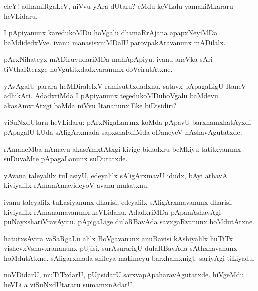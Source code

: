 \documentclass{article}
\begin{document}
\begin{mn}%
eleY! adhamiRgaLeV, niVvu yAra dUtaru? eMdu keVLalu yamakiMkararu heVLidaru.
\end{mn}

\begin{mn}%
I pApiyanunx karedukoMDu hoVgalu dhamaRrAjana apapxNeyiMDa baMdidedxVve. ivanu 
manasisxniMDalU parovpakAravanunx mADilalx.
\end{mn}

\begin{mn}%
pArxNihateyx mADiruvudariMDa mahApApiyu. ivanu aneVka sAri tiVthaRterxge 
hoVgutitxdadxvaranunx doVcirutAtxne.
\end{mn}

\begin{mn}%
yAvAgalU parara heMDiralelxV ramisutitxdadxnu. satavx pApagaLigU ItaneV adhikAri. 
AdadxriMda I pApiyanunx tegedukoMDuhoVgalu baMdevu. akasAmxtAtxgi baMda niVvu Itananunx 
Eke biDisidiri?
\end{mn}

\begin{mn}%
viSuNxdUtaru heVLidaru:-pArxNigaLanunx koMda pApavU barxhamxhatAyxdi pApagalU kUda 
sAligArxmada sapxshaRdiMda oDaneyeV nAshavAgutatxde.
\end{mn}

\begin{mn}%
rAmaneMba nAmavu akasAmxtAtxgi kivige bidadxru beMkiyu tatitxyanunx suDuvaMte pApagaLanunx 
suDutatxde.
\end{mn}

\begin{mn}%
yAvana taleyalilx tuLasiyU, edeyalilx sAligArxmavU idudx, bAyi athavA kiviyalilx 
rAmanAmavideyoV avanu mukatxnu.
\end{mn}

\begin{mn}%
ivanu taleyalilx tuLasiyanunx dharisi, edeyalilx sAligArxmavanunx dharisi, kiviyalilx 
rAmanamavanunx keVLidanu. AdadxriMDa pApanAshavAgi puNayxshariVravAyitu. pApigaLige 
dulaRBavAda savxgaRvanunx hoMdutAtxne.
\end{mn}

\begin{mn}%
hatutxsAvira vaSaRgaLu alilx BoVgavanunx anuBavisi kAshiyalilx huTiTx vishevxVshavxrananunx 
pUjisi, surAsurarigU dulaRBavAda sAthxnavanunx hoMdutAtxne. sAligarxmada shileya mahimeyu 
barxhamxnigU sariyAgi tiLiyadu.
\end{mn}

\begin{mn}%
noVDidarU, muTiTxdarU, pUjisidarU sarxvapApaharavAgutatxde. hiVgeMdu heVLi a viSuNxdUtararu
sumamxnAdarU.
\end{mn}
\end{document}

